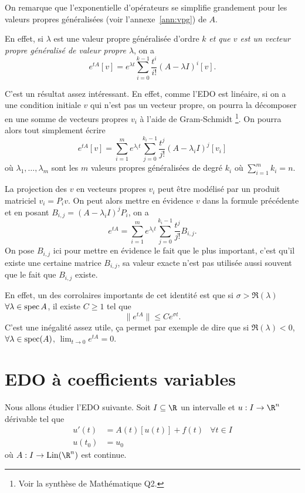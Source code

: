 On remarque que l'exponentielle d'opérateurs se simplifie grandement
pour les valeurs propres généralisées (voir l'annexe~\ref{ann:vpg}) de $A$.

En effet, si $\lambda$ est une valeur propre généralisée d'ordre $k$
\emph{et que $v$ est un vecteur propre généralisé de valeur propre $\lambda$},
on a
\[ e^{tA}[v] =
e^{\lambda t} \sum_{i=0}^{k-1}\frac{t^i}{i!}(A-\lambda I)^i[v]. \]

C'est un résultat assez intéressant.
En effet, comme l'EDO est linéaire, si on a une condition initiale
$v$ qui n'est pas un vecteur propre, on pourra la décomposer en une somme
de vecteurs propres $v_i$ à l'aide de Gram-Schmidt
\footnote{Voir la synthèse de Mathématique Q2.}. %
On pourra alors tout simplement écrire
\[ e^{tA}[v] =
\sum_{i=1}^m e^{\lambda_i t}
\sum_{j=0}^{k_i-1}\frac{t^j}{j!}(A-\lambda_i I)^j[v_i] \]
où $\lambda_1, \ldots, \lambda_m$ sont les $m$ valeurs propres généralisées
de degré $k_i$ où $\sum_{i=1}^m k_i = n$.

La projection des $v$ en vecteurs propres $v_i$ peut être modélisé
par un produit matriciel $v_i = P_i v$.
On peut alors mettre en évidence $v$ dans la formule précédente et en posant
$B_{i,j} = (A-\lambda_i I)^j P_i$, on a
\[ e^{tA} =
\sum_{i=1}^m e^{\lambda_i t}
\sum_{j=0}^{k_i-1}\frac{t^j}{j!}B_{i,j}. \]
On pose $B_{i,j}$ ici pour mettre en évidence le fait que le plus important,
c'est qu'il existe une certaine matrice $B_{i,j}$,
sa valeur exacte n'est pas utilisée aussi souvent que le fait que $B_{i,j}$
existe.

En effet, un des corrolaires importants de cet identité est que
si $\sigma > \Re(\lambda)$ $\forall \lambda \in \operatorname{spec} A$,
il existe $C \geq 1$ tel que
\[ \|e^{tA}\| \leq Ce^{\sigma t}. \]
C'est une inégalité assez utile,
ça permet par exemple de dire que si
$\Re(\lambda) < 0$, $\forall \lambda \in \operatorname{spec}(A)$,
$\lim_{t\to 0} e^{tA} = 0$.

\section{EDO à coefficients variables}
Nous allons étudier l'EDO suivante.
Soit $I \subseteq \R$ un intervalle et $u:I\to\R^n$ dérivable tel que
\begin{align*}
  u'(t) & = A(t)[u(t)] + f(t) & \forall t \in I\\
  u(t_0) & = u_0
\end{align*}
où $A : I \to \lin(\R^n)$ est continue.

